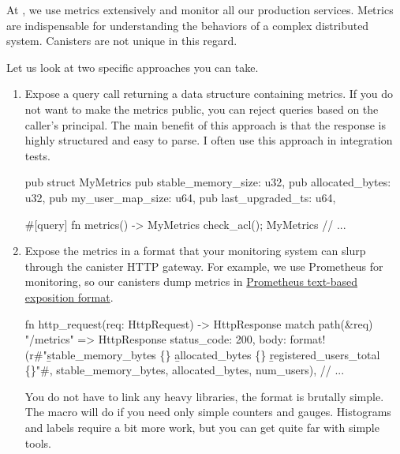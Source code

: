 \documentclass{article}
\begin{document}
At \href{https://dfinity.org/}{}, we use metrics extensively and monitor all our production services.
Metrics are indispensable for understanding the behaviors of a complex distributed system.
Canisters are not unique in this regard.


Let us look at two specific approaches you can take.

\begin{enumerate}
\item 
  Expose a query call returning a data structure containing metrics.
  If you do not want to make the metrics public, you can reject queries based on the caller's principal.
  The main benefit of this approach is that the response is highly structured and easy to parse.
  I often use this approach in integration tests.

\begin{code}[good]
pub struct MyMetrics {
  pub stable_memory_size: u32,
  pub allocated_bytes: u32,
  pub my_user_map_size: u64,
  pub last_upgraded_ts: u64,
}

#[query]
fn metrics() -> MyMetrics {
  check_acl();
  MyMetrics {
    // ...
  }
}
\end{code}
\item 

  Expose the metrics in a format that your monitoring system can slurp through the canister HTTP gateway.
  For example, we use Prometheus for monitoring, so our canisters dump metrics in \href{https://prometheus.io/docs/instrumenting/exposition_formats/#text-based-format}{Prometheus text-based exposition format}.

\begin{code}[good]
fn http_request(req: HttpRequest) -> HttpResponse {
  match path(&req) {
    "/metrics" => HttpResponse {
        status_code: 200,
        body: format!(r#"\b{stable_memory_bytes \{\}}
                         \b{allocated_bytes \{\}}
                         \b{registered_users_total \{\}}"#,
                      stable_memory_bytes, allocated_bytes, num_users),
        // ...
    }
  }
}
\end{code}

  You do not have to link any heavy libraries, the format is brutally simple.
  The  macro will do if you need only simple counters and gauges.
  Histograms and labels require a bit more work, but you can get quite far with simple tools.
\end{enumerate}
\end{document}
